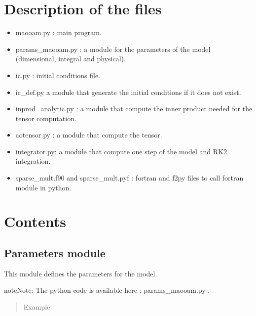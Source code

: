 \documentclass[letterpaper,10pt,english]{sphinxmanual}
\begin{document}
\chapter{Description of the files}
\label{index:description-of-the-files}\begin{itemize}
\item {} 
maooam.py : main program.

\item {} 
params\_maooam.py : a module for the parameters of the model (dimensional, integral and physical).

\item {} 
ic.py : initial conditions file.

\item {} 
ic\_def.py a module that generate the initial conditions if it does not exist.

\item {} 
inprod\_analytic.py : a module that compute the inner product needed for the tensor computation.

\item {} 
aotensor.py : a module that compute the tensor.

\item {} 
integrator.py: a module that compute one step of the model and RK2 integration.

\item {} 
sparse\_mult.f90 and sparse\_mult.pyf : fortran and f2py files to call fortran module in python.

\end{itemize}


\chapter{Contents}
\label{index:contents}\label{rstfiles/params_maooam:module-params_maooam}

\section{Parameters module}
\label{rstfiles/params_maooam::doc}\label{rstfiles/params_maooam:parameters-module}
This module defines the parameters for the model.

\begin{notice}{note}{Note:}
The python code is available here :     params\_maooam.py .
\end{notice}
\begin{quote}\begin{description}
\item[{Example}] \leavevmode
\end{description}\end{quote}
\end{document}
